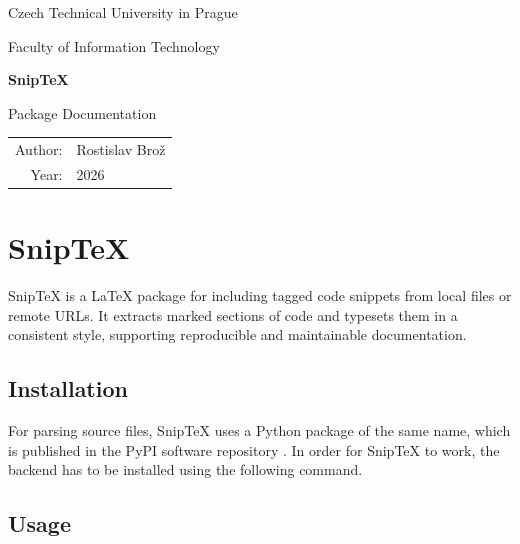 \documentclass{article}
\begin{document}
\begin{titlepage}
    \centering

    {\Large Czech Technical University in Prague\par}
    {\Large Faculty of Information Technology\par}

    \vspace{3cm}

    {\Huge\bfseries Snip\TeX\par}

    \vspace{0.5cm}

    {\Large Package Documentation\par}

    \vfill

    \begin{tabular}{rl}
        Author: & Rostislav Brož \\
        Year: & 2026 \\
    \end{tabular}

    \vspace{2cm}
\end{titlepage}

\section*{Snip\TeX}

Snip\TeX{} is a La\TeX{} package for including tagged code snippets from local files or remote URLs. 
It extracts marked sections of code and typesets them in a consistent style, 
supporting reproducible and maintainable documentation.

\subsection*{Installation}

For parsing source files, Snip\TeX{} uses a Python package of the same name, 
which is published in the PyPI software repository \citep{pypi}. 
In order for Snip\TeX{} to work, 
the backend has to be installed using the following command.


\subsection*{Usage}
\end{document}
